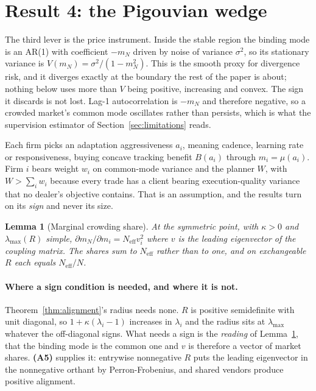 \documentclass{article}
\theoremstyle{plain}
\newtheorem{lemma}[theorem]{Lemma}
\theoremstyle{definition}
\newcommand{\Neff}{N_{\mathrm{eff}}}
\newcommand{\mN}{m_N}
\newcommand{\lmax}{\lambda_{\max}}
\begin{document}
\section{Result 4: the Pigouvian wedge}
\label{sec:wedge}

The third lever is the price instrument. Inside the stable region the binding mode is an AR(1) with coefficient $-\mN$ driven by noise of variance $\sigma^2$, so its stationary variance is $V(\mN) = \sigma^2/(1-\mN^2)$. This is the smooth proxy for divergence risk, and it diverges exactly at the boundary the rest of the paper is about; nothing below uses more than $V$ being positive, increasing and convex. The sign it discards is not lost. Lag-1 autocorrelation is $-\mN$ and therefore negative, so a crowded market's common mode oscillates rather than persists, which is what the supervision estimator of Section~\ref{sec:limitations} reads.

Each firm picks an adaptation aggressiveness $a_i$, meaning cadence, learning rate or responsiveness, buying concave tracking benefit $B(a_i)$ through $m_i = \mu(a_i)$. Firm $i$ bears weight $w_i$ on common-mode variance and the planner $W$, with $W > \sum_i w_i$ because every trade has a client bearing execution-quality variance that no dealer's objective contains. That is an assumption, and the results turn on its \emph{sign} and never its size.

\begin{lemma}[Marginal crowding share]
\label{lem:share}
At the symmetric point, with $\kappa>0$ and $\lmax(R)$ simple, $\partial \mN/\partial m_i = \Neff v_i^2$ where $v$ is the leading eigenvector of the coupling matrix. The shares sum to $\Neff$ rather than to one, and on exchangeable $R$ each equals $\Neff/N$.
\end{lemma}

\paragraph{Where a sign condition is needed, and where it is not.}
Theorem~\ref{thm:alignment}'s radius needs none. $R$ is positive semidefinite with unit diagonal, so $1+\kappa(\lambda_i-1)$ increases in $\lambda_i$ and the radius sits at $\lmax$ whatever the off-diagonal signs. What needs a sign is the \emph{reading} of Lemma~\ref{lem:share}, that the binding mode is the common one and $v$ is therefore a vector of market shares. \textbf{(A5)} supplies it: entrywise nonnegative $R$ puts the leading eigenvector in the nonnegative orthant by Perron-Frobenius, and shared vendors produce positive alignment.
\end{document}
